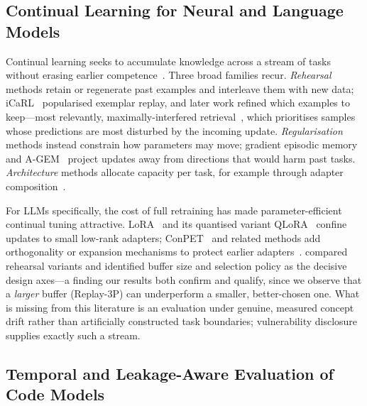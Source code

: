 \documentclass[a4paper,twoside]{article}
\begin{document}
\subsection{Continual Learning for Neural and Language Models}
\label{sec:related-cl}

\noindent Continual learning seeks to accumulate knowledge across a stream of tasks without erasing earlier competence~\citep{VandeVen2022CLSurvey,Wu2024CLSurvey}. Three broad families recur. \emph{Rehearsal} methods retain or regenerate past examples and interleave them with new data; iCaRL~\citep{Rebuffi2017iCaRL} popularised exemplar replay, and later work refined which examples to keep---most relevantly, maximally-interfered retrieval~\citep{Aljundi2019MIR}, which prioritises samples whose predictions are most disturbed by the incoming update. \emph{Regularisation} methods instead constrain how parameters may move; gradient episodic memory~\citep{LopezPaz2017GEM} and A-GEM~\citep{Chaudhry2019AGEM} project updates away from directions that would harm past tasks. \emph{Architecture} methods allocate capacity per task, for example through adapter composition~\citep{Pfeiffer2021AdapterFusion}.

For LLMs specifically, the cost of full retraining has made parameter-efficient continual tuning attractive. LoRA~\citep{Hu2021LoRA} and its quantised variant QLoRA~\citep{Dettmers2023QLoRA} confine updates to small low-rank adapters; ConPET~\citep{Song2023ConPET} and related methods add orthogonality or expansion mechanisms to protect earlier adapters~\citep{Qiao2024BotherLess}. \citet{Han2023CLCompare} compared rehearsal variants and identified buffer size and selection policy as the decisive design axes---a finding our results both confirm and qualify, since we observe that a \emph{larger} buffer (Replay-3P) can underperform a smaller, better-chosen one. What is missing from this literature is an evaluation under genuine, measured concept drift rather than artificially constructed task boundaries; vulnerability disclosure supplies exactly such a stream.

\subsection{Temporal and Leakage-Aware Evaluation of Code Models}
\label{sec:related-eval}
\end{document}
